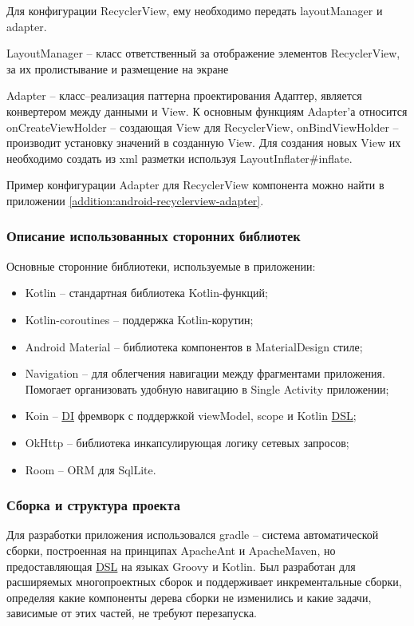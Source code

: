 Для конфигурации RecyclerView, ему необходимо передать layoutManager и adapter.

LayoutManager – класс ответственный за отображение элементов RecyclerView, за их пролистывание и размещение на экране

Adapter – класс–реализация паттерна проектирования Адаптер, является конвертером между данными и View.
К основным функциям Adapter’а относится onCreateViewHolder – создающая View для RecyclerView, onBindViewHolder – производит установку значений в созданную View.
Для создания новых View их необходимо создать из xml разметки используя LayoutInflater\#inflate.

Пример конфигурации Adapter для RecyclerView компонента можно найти в приложении \ref{addition:android-recyclerview-adapter}.

\subsubsection{Описание использованных сторонних библиотек}\indent

Основные сторонние библиотеки, используемые в приложении:

\begin{itemize}
    \item Kotlin – стандартная библиотека Kotlin-функций;
    \item Kotlin-coroutines – поддержка Kotlin-корутин;
    \item Android Material – библиотека компонентов в MaterialDesign стиле;
    \item Navigation – для облегчения навигации между фрагментами приложения. Помогает организовать удобную навигацию в Single Activity приложении;
    \item Koin – \hyperlink{gloss:di}{DI} фремворк с поддержкой viewModel, scope и Kotlin \hyperlink{gloss:dsl}{DSL};
    \item OkHttp – библиотека инкапсулирующая логику сетевых запросов;
    \item Room – ORM для SqlLite.
\end{itemize}

\subsubsection{Сборка и структура проекта}\indent

Для разработки приложения использовался gradle – система автоматической сборки, построенная на принципах ApacheAnt и ApacheMaven, но предоставляющая \hyperlink{gloss:dsl}{DSL} на языках Groovy и Kotlin.
Был разработан для расширяемых многопроектных сборок и поддерживает инкрементальные сборки, определяя какие компоненты дерева сборки не изменились и какие задачи, зависимые от этих частей, не требуют перезапуска.

